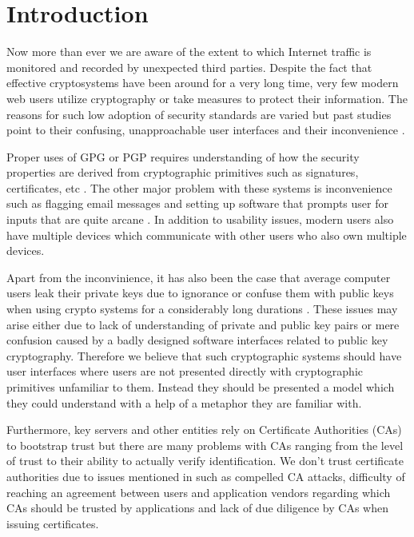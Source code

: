 \section{Introduction}
\label{sec:intro}


Now more than ever we are aware of the extent to which Internet traffic is monitored and recorded by unexpected third parties. Despite the fact that effective cryptosystems have been around for a very long time, very few modern web users utilize cryptography or take measures to protect their information. The reasons for such low adoption of security standards are varied but past studies point to their confusing, unapproachable user interfaces and their inconvenience \cite{Jhonny, paranoia}. 

Proper uses of GPG or PGP requires understanding of how the security properties are derived from cryptographic primitives such as signatures, certificates, etc \cite{pgp, gpg}. The other major problem with these systems is inconvenience such as flagging email messages and setting up software that prompts user for inputs that are quite arcane \cite{paranoia}. In addition to usability issues, modern users also have multiple devices which communicate with other users who also own  multiple devices.

Apart from the inconvinience, it has also been the case that average computer users leak their private keys due to ignorance or confuse them with public keys when using crypto systems for a considerably long durations \cite{Jhonny}. These issues may arise either due to lack of understanding of private and public key pairs or mere confusion caused by a badly designed software interfaces related to public key cryptography. Therefore we believe that such cryptographic systems should have user interfaces where users are not presented directly with cryptographic primitives unfamiliar to them. Instead they should be presented a model which they could understand with a help of a metaphor they are familiar with.

Furthermore, key servers and other entities rely on Certificate Authorities (CAs) to bootstrap trust but there are many problems with CAs ranging from the level of trust to their ability to actually verify identification. We don't trust certificate authorities due to issues mentioned in\cite{certlies, SoK} such as compelled CA attacks, difficulty of reaching an agreement between users and application vendors regarding which CAs should be trusted by applications and lack of due diligence by CAs when issuing certificates.

